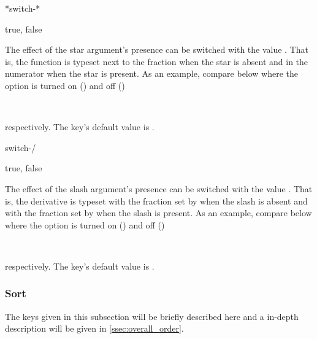 	\begin{option}*{switch-*}
		\begin{values}[default = false]
			true, false
		\end{values}
		The effect of the star argument's presence can be switched with the value . That is, the function is typeset next to the fraction when the star is absent and in the numerator when the star is present. As an example, compare below where the option is turned on () and off ()
		
		\begin{example}
			 \\
		\end{example}
		
		\noindent respectively. The key's default value is \default.
	\end{option}
	
	\begin{option}{switch-/}
		\begin{values}[default = false]
			true, false
		\end{values}
		The effect of the slash argument's presence can be switched with the value . That is, the derivative is typeset with the fraction set by  when the slash is absent and with the fraction set by  when the slash is present. As an example, compare below where the option is turned on () and off (\val{false})
		
		\begin{example}
			\pdv[switch-/=false]{y}{x} \\
			\pdv[switch-/=true]{y}{x}
		\end{example}
		
		\noindent respectively. The key's default value is .
	\end{option}
	
	\subsubsection*{Sort}
	The keys given in this subsection will be briefly described here and a in-depth description will be given in \cref{ssec:overall_order}.
	
